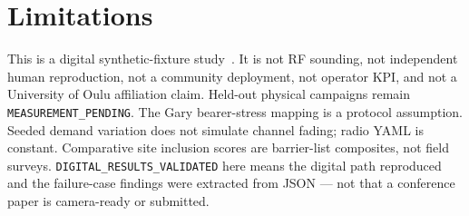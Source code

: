 \section{Limitations}
\label{sec:limitations}
This is a digital synthetic-fixture study~\cite{itur_m2160}.
It is not RF sounding, not independent human reproduction, not a community deployment, not operator KPI, and not a University of Oulu affiliation claim.
Held-out physical campaigns remain \texttt{MEASUREMENT\_PENDING}.
The Gary bearer-stress mapping is a protocol assumption.
Seeded demand variation does not simulate channel fading; radio YAML is constant.
Comparative site inclusion scores are barrier-list composites, not field surveys.
\texttt{DIGITAL\_RESULTS\_VALIDATED} here means the digital path reproduced and the failure-case findings were extracted from JSON --- not that a conference paper is camera-ready or submitted.
